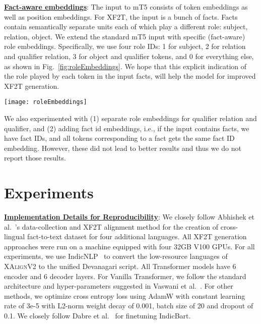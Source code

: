 \documentclass[runningheads]{llncs}
\newcommand{\data}{\textsc{XAlignV2}}
\begin{document}
\noindent\underline{\textbf{Fact-aware embeddings}}: 
The input to mT5 consists of token embeddings as well as position embeddings. For XF2T, the input is a bunch of facts. Facts contain semantically separate units each of which play a different role: subject, relation, object. We extend the standard mT5 input with specific (fact-aware) role embeddings. Specifically, we use four role IDs: 1 for subject, 2 for relation and qualifier relation, 3 for object and qualifier tokens, and 0 for everything else, as shown in Fig.~\ref{fig:roleEmbeddings}. We hope that this explicit indication of the role played by each token in the input facts, will help the model for improved XF2T generation. 

\begin{figure*}
    \centering
    \texttt{[image: roleEmbeddings]}
    \caption{English facts being passed as input to mT5's encoder with token, position and (fact-aware) role embeddings.}
    \label{fig:roleEmbeddings}
\end{figure*}

We also experimented with (1) separate role embeddings for qualifier relation and qualifier, and (2) adding fact id embeddings, i.e., if the input contains  facts, we have  fact IDs, and all tokens corresponding to a fact gets the same fact ID embedding. However, these did not lead to better results and thus we do not report those results.










\section{Experiments}
\label{sec:experiments}
\noindent\underline{\textbf{Implementation Details for Reproducibility}}: We closely follow Abhishek et al.~\cite{abhishek2022xalign}'s data-collection and XF2T alignment method for the creation of cross-lingual fact-to-text dataset for four additional languages. All XF2T generation approaches were run on a machine equipped with four 32GB V100 GPUs. For all experiments, we use IndicNLP~\cite{kakwani2020indicnlpsuite} to convert the low-resource languages of \data{} to the unified Devanagari script. All Transformer models have 6 encoder and 6 decoder layers. For Vanilla Transformer, we follow the standard architecture and hyper-parameters suggested in Vaswani et al.~\cite{vaswani2017attention}. For other methods,  we optimize cross entropy loss using AdamW with constant learning rate of 3e-5 with L2-norm weight decay of 0.001, batch size of 20 and dropout of 0.1. We closely follow Dabre et al.~\cite{dabre2021indicbart} for finetuning IndicBart.  
\end{document}
